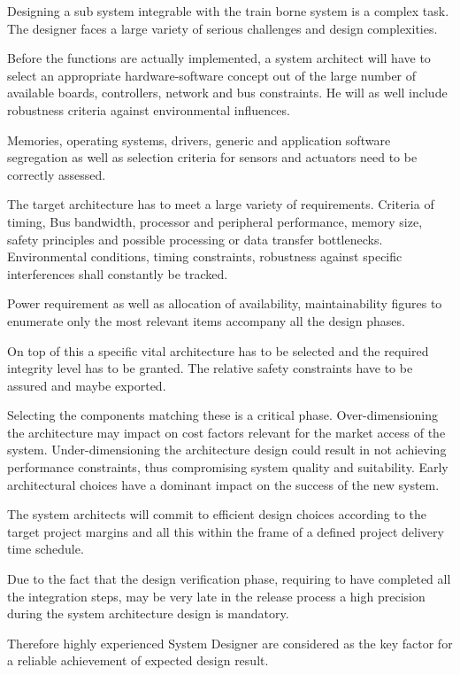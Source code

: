 Designing a sub system integrable with the train borne system is a complex task. The designer faces a large variety of serious challenges and design complexities. 

Before the functions are actually implemented, a system architect will have to select an appropriate hardware-software concept out of the large number of available boards, controllers, network and  bus constraints.  He  will as well include robustness criteria against environmental influences. 

Memories, operating systems, drivers, generic and application software segregation as well as selection criteria for sensors and actuators need to be correctly assessed. 

The target architecture has to meet a large variety of requirements. Criteria of timing, Bus bandwidth, processor and peripheral performance, memory size, safety principles and possible processing or data transfer bottlenecks. Environmental conditions, timing constraints, robustness against specific interferences shall constantly be tracked.

Power requirement as well as allocation of availability, maintainability figures to enumerate only the most relevant items accompany all the design phases.

On top of this a specific vital architecture has to be selected and the required integrity level has to be granted. The relative safety constraints have to be assured and maybe exported.

Selecting the components matching these is a critical phase. Over-dimensioning the architecture may impact on cost factors relevant for the market access of the system. Under-dimensioning the architecture design could result in not achieving performance constraints, thus compromising system quality and suitability. Early architectural choices have a dominant impact on the success of the new system. 

The system architects will commit to efficient design choices according to the target project margins and all this within the frame of a defined project delivery time schedule. 

Due to the fact that the design verification phase, requiring to have completed all the integration steps, may be very late in the release process a high precision during the system architecture design is mandatory. 

Therefore highly experienced System Designer are considered as the key factor for a reliable achievement of expected design result.

